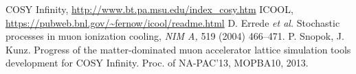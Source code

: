 \documentclass{jacow}
\begin{document}
\begin{thebibliography}{9}   %
COSY Infinity, \url{http://www.bt.pa.msu.edu/index_cosy.htm}
ICOOL, \url{https://pubweb.bnl.gov/~fernow/icool/readme.html}
D. Errede \emph{et al.} Stochastic processes in muon ionization cooling, \emph {NIM A,} 519 (2004) 466--471.
P. Snopok, J. Kunz. Progress of the matter-dominated muon accelerator lattice simulation tools development for COSY Infinity. Proc. of NA-PAC'13, MOPBA10, 2013.

\end{thebibliography}
\mbox{}
\end{document}
